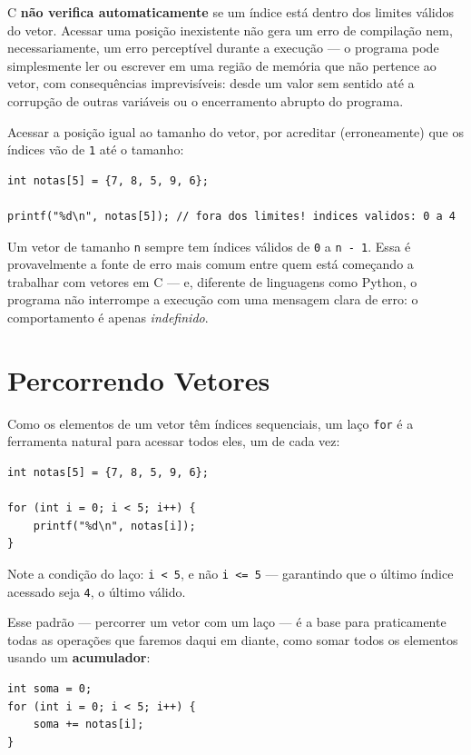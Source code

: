 \documentclass[12pt,a4paper,oneside]{extreport}
\begin{document}
C \textbf{não verifica automaticamente} se um índice está dentro dos limites válidos do vetor. Acessar uma posição inexistente não gera um erro de compilação nem, necessariamente, um erro perceptível durante a execução — o programa pode simplesmente ler ou escrever em uma região de memória que não pertence ao vetor, com consequências imprevisíveis: desde um valor sem sentido até a corrupção de outras variáveis ou o encerramento abrupto do programa.

\begin{errocomum}
Acessar a posição igual ao tamanho do vetor, por acreditar (erroneamente) que os índices vão de \texttt{1} até o tamanho:
\begin{lstlisting}
int notas[5] = {7, 8, 5, 9, 6};

printf("%d\n", notas[5]); // fora dos limites! indices validos: 0 a 4
\end{lstlisting}
Um vetor de tamanho \texttt{n} sempre tem índices válidos de \texttt{0} a \texttt{n - 1}. Essa é provavelmente a fonte de erro mais comum entre quem está começando a trabalhar com vetores em C — e, diferente de linguagens como Python, o programa não interrompe a execução com uma mensagem clara de erro: o comportamento é apenas \textit{indefinido}.
\end{errocomum}

\section{Percorrendo Vetores}

Como os elementos de um vetor têm índices sequenciais, um laço \texttt{for} é a ferramenta natural para acessar todos eles, um de cada vez:

\begin{lstlisting}
int notas[5] = {7, 8, 5, 9, 6};

for (int i = 0; i < 5; i++) {
    printf("%d\n", notas[i]);
}
\end{lstlisting}

Note a condição do laço: \texttt{i < 5}, e não \texttt{i <= 5} — garantindo que o último índice acessado seja \texttt{4}, o último válido.

Esse padrão — percorrer um vetor com um laço — é a base para praticamente todas as operações que faremos daqui em diante, como somar todos os elementos usando um \textbf{acumulador}:

\begin{lstlisting}
int soma = 0;
for (int i = 0; i < 5; i++) {
    soma += notas[i];
}
\end{lstlisting}
\end{document}
